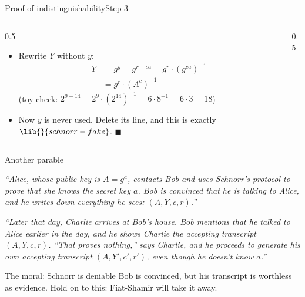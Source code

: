 \ifdefined\PRESENTATION\else\PassOptionsToClass{handout}{beamer}\fi\documentclass[aspectratio=169, lualatex]{beamer}
\begin{document}
\begin{frame}{Proof of indistinguishability}{Step 3}
	\begin{columns}[c]
		\begin{column}{0.5\textwidth}
			\begin{itemize}[<+->]
				\item Rewrite $Y$ without $y$:
				      \begin{align*}
					      Y & = g^{y} = g^{r - ca} = g^{r} \cdot (g^{ca})^{-1} \\
					        & = g^{r} \cdot (A^{c})^{-1}
				      \end{align*}
				      (toy check: $2^{9 - 14} = 2^{9} \cdot (2^{14})^{-1} = 6 \cdot 8^{-1} = 6 \cdot 3 = 18$)
				\item Now $y$ is never used. Delete its line, and this is exactly $\lib{}{schnorr-fake}$. $\blacksquare$
			\end{itemize}
		\end{column}
		\begin{column}{0.5\textwidth}
			\begin{center}
			\end{center}
		\end{column}
	\end{columns}
\end{frame}

\begin{frame}{Another parable}
	\vfill
	{\rmfamily\itshape ``Alice, whose public key is $A = g^a$, contacts Bob and uses Schnorr's protocol to prove that she knows the secret key $a$. Bob is convinced that he is talking to Alice, and he writes down everything he sees: $(A, Y, c, r)$.''\par}
	\vspace{0.5cm}
	\pause
	{\rmfamily\itshape ``Later that day, Charlie arrives at Bob's house. Bob mentions that he talked to Alice earlier in the day, and he shows Charlie the accepting transcript $(A,Y,c,r)$. ``That proves nothing,'' says Charlie, and he proceeds to generate his own accepting transcript $(A,Y',c',r')$, even though he doesn't know $a$.''\par}
	\vspace{0.5cm}
	\pause
	\begin{alertblock}{The moral: Schnorr is deniable}
		Bob is convinced, but his transcript is worthless as evidence. Hold on to this: Fiat-Shamir will take it away.
	\end{alertblock}
	\vfill
\end{frame}
\end{document}
